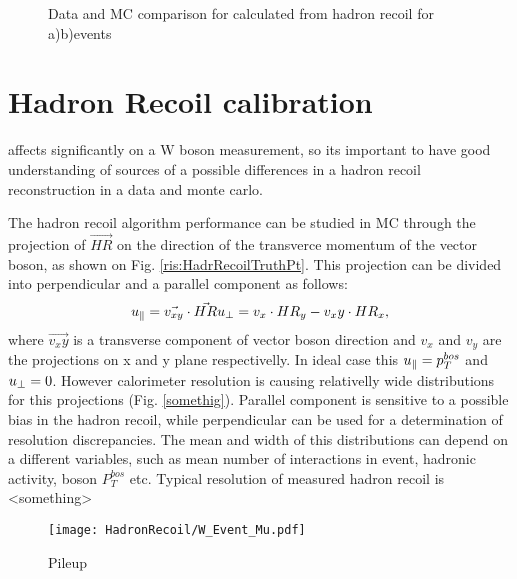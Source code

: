 \begin{figure}[b]
\begin{minipage}[h]{0.49\linewidth}
\end{minipage}
\hfill
\begin{minipage}[h]{0.49\linewidth}
\end{minipage}
\caption{Data and MC comparison for \etmiss calculated from hadron recoil for a)\wenu b)\wmunu events}
\label{ris:EtMissRefFinal}
\end{figure}



\section{Hadron Recoil calibration}
\etmiss affects significantly on a W boson measurement, so its important to have good understanding of sources of a possible differences in a hadron recoil reconstruction in a data and monte carlo. 

The hadron recoil algorithm performance can be studied in MC through the projection of $\vec{HR}$ on the direction of the transverce momentum of the vector boson, as shown on Fig. \ref{ris:HadrRecoilTruthPt}. This projection can be divided into perpendicular \uperp and a parallel \upar component as follows:
\begin{equation}
u_{\parallel}=\vec{v_{xy}}\cdot\vec{HR}
u_{\perp}=v_x\cdot HR_y - v_xy \cdot HR_x,
\end{equation}
where $\vec{v_xy}$ is a transverse component of vector boson direction and $v_x$ and $v_y$ are the projections on x and y plane respectivelly. In ideal case this $u_{\parallel}=p_T^{bos}$ and $u_{\perp} = 0$. However calorimeter resolution is causing relativelly wide distributions for this projections (Fig. \ref{somethig}). Parallel component \upar is sensitive to a possible bias in the hadron recoil, while perpendicular \uperp can be used for a determination of resolution discrepancies. The mean and width of this distributions can depend on a different variables, such as mean number of interactions in event, hadronic activity, boson $P_{T}^{bos}$ etc. Typical resolution of measured hadron recoil is <something>

\begin{figure}[t]
\centering
\texttt{[image: HadronRecoil/W\_Event\_Mu.pdf]}
\caption{Pileup}
\label{HadrRecoil:mu}
\end{figure} 
 
